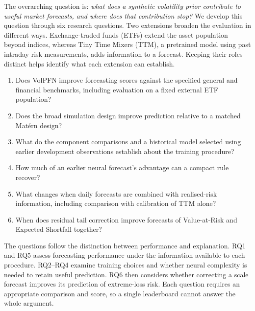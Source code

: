 The overarching question is: \emph{what does a synthetic volatility prior contribute to useful market forecasts, and where does that contribution stop?} We develop this question through six research questions. Two extensions broaden the evaluation in different ways. Exchange-traded funds (ETFs) extend the asset population beyond indices, whereas Tiny Time Mixers (TTM), a pretrained model using past intraday risk measurements, adds information to a forecast. Keeping their roles distinct helps identify what each extension can establish.

\begin{enumerate}[label=RQ\arabic*.,leftmargin=1.5cm]
\item Does VolPFN improve forecasting scores against the specified general and financial benchmarks, including evaluation on a fixed external ETF population?
\item Does the broad simulation design improve prediction relative to a matched Mat\'ern design?
\item What do the component comparisons and a historical model selected using earlier development observations establish about the training procedure?
\item How much of an earlier neural forecast's advantage can a compact rule recover?
\item What changes when daily forecasts are combined with realised-risk information, including comparison with calibration of TTM alone?
\item When does residual tail correction improve forecasts of Value-at-Risk and Expected Shortfall together?
\end{enumerate}

The questions follow the distinction between performance and explanation. RQ1 and RQ5 assess forecasting performance under the information available to each procedure. RQ2--RQ4 examine training choices and whether neural complexity is needed to retain useful prediction. RQ6 then considers whether correcting a scale forecast improves its prediction of extreme-loss risk. Each question requires an appropriate comparison and score, so a single leaderboard cannot answer the whole argument.

